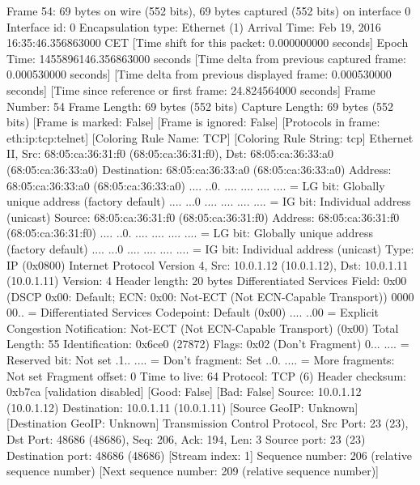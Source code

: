 Frame 54: 69 bytes on wire (552 bits), 69 bytes captured (552 bits) on interface 0
    Interface id: 0
    Encapsulation type: Ethernet (1)
    Arrival Time: Feb 19, 2016 16:35:46.356863000 CET
    [Time shift for this packet: 0.000000000 seconds]
    Epoch Time: 1455896146.356863000 seconds
    [Time delta from previous captured frame: 0.000530000 seconds]
    [Time delta from previous displayed frame: 0.000530000 seconds]
    [Time since reference or first frame: 24.824564000 seconds]
    Frame Number: 54
    Frame Length: 69 bytes (552 bits)
    Capture Length: 69 bytes (552 bits)
    [Frame is marked: False]
    [Frame is ignored: False]
    [Protocols in frame: eth:ip:tcp:telnet]
    [Coloring Rule Name: TCP]
    [Coloring Rule String: tcp]
Ethernet II, Src: 68:05:ca:36:31:f0 (68:05:ca:36:31:f0), Dst: 68:05:ca:36:33:a0 (68:05:ca:36:33:a0)
    Destination: 68:05:ca:36:33:a0 (68:05:ca:36:33:a0)
        Address: 68:05:ca:36:33:a0 (68:05:ca:36:33:a0)
        .... ..0. .... .... .... .... = LG bit: Globally unique address (factory default)
        .... ...0 .... .... .... .... = IG bit: Individual address (unicast)
    Source: 68:05:ca:36:31:f0 (68:05:ca:36:31:f0)
        Address: 68:05:ca:36:31:f0 (68:05:ca:36:31:f0)
        .... ..0. .... .... .... .... = LG bit: Globally unique address (factory default)
        .... ...0 .... .... .... .... = IG bit: Individual address (unicast)
    Type: IP (0x0800)
Internet Protocol Version 4, Src: 10.0.1.12 (10.0.1.12), Dst: 10.0.1.11 (10.0.1.11)
    Version: 4
    Header length: 20 bytes
    Differentiated Services Field: 0x00 (DSCP 0x00: Default; ECN: 0x00: Not-ECT (Not ECN-Capable Transport))
        0000 00.. = Differentiated Services Codepoint: Default (0x00)
        .... ..00 = Explicit Congestion Notification: Not-ECT (Not ECN-Capable Transport) (0x00)
    Total Length: 55
    Identification: 0x6ce0 (27872)
    Flags: 0x02 (Don't Fragment)
        0... .... = Reserved bit: Not set
        .1.. .... = Don't fragment: Set
        ..0. .... = More fragments: Not set
    Fragment offset: 0
    Time to live: 64
    Protocol: TCP (6)
    Header checksum: 0xb7ca [validation disabled]
        [Good: False]
        [Bad: False]
    Source: 10.0.1.12 (10.0.1.12)
    Destination: 10.0.1.11 (10.0.1.11)
    [Source GeoIP: Unknown]
    [Destination GeoIP: Unknown]
Transmission Control Protocol, Src Port: 23 (23), Dst Port: 48686 (48686), Seq: 206, Ack: 194, Len: 3
    Source port: 23 (23)
    Destination port: 48686 (48686)
    [Stream index: 1]
    Sequence number: 206    (relative sequence number)
    [Next sequence number: 209    (relative sequence number)]
